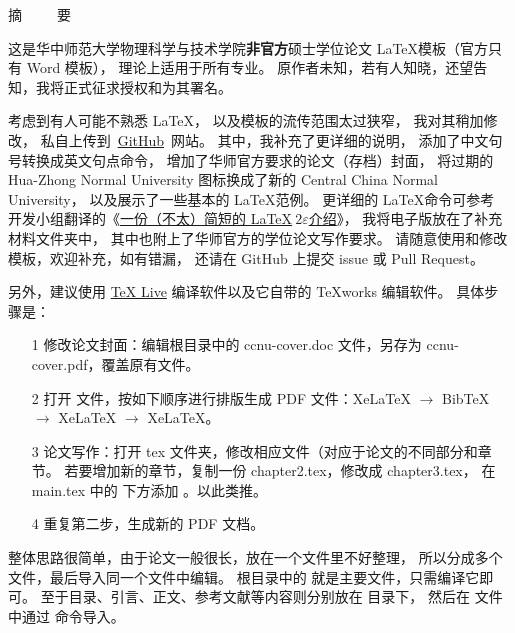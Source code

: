 \newpage
 \vspace{1.0cm}
 \headsep=1.5cm
 \centerline{\hei \sanhao 摘\ \ \ \ \ 要}
 \label{zhaiyao}
\vspace{0.5cm}
 \pagestyle{fancy}
 \fancyfoot[C]{---\thepage---}

这是华中师范大学物理科学与技术学院\textbf{非官方}硕士学位论文 \LaTeX 模板（官方只有 Word 模板），
理论上适用于所有专业。
原作者未知，若有人知晓，还望告知，我将正式征求授权和为其署名。

考虑到有人可能不熟悉 \LaTeX，
以及模板的流传范围太过狭窄，
我对其稍加修改，
私自上传到~\href{https://github.com/ichenh/ccnu-latex}{GitHub}~网站。
其中，我补充了更详细的说明，
添加了中文句号转换成英文句点命令，
增加了华师官方要求的论文（存档）封面，
将过期的 Hua-Zhong Normal University 图标换成了新的 Central China Normal University，
以及展示了一些基本的 \LaTeX 范例。
更详细的 \LaTeX 命令可参考 \CTeX 开发小组翻译的《\href{http://mirrors.ibiblio.org/CTAN/info/lshort/chinese/lshort-zh-cn.pdf}{一份（不太）简短的 \LaTeX $\ 2\varepsilon$介绍}》，
我将电子版放在了补充材料文件夹中，
其中也附上了华师官方的学位论文写作要求。
请随意使用和修改模板，欢迎补充，如有错漏，
还请在 GitHub 上提交 issue 或 Pull Request。

另外，建议使用 \href{https://ctan.org/mirrors/mirmon#cn}{TeX Live} 编译软件以及它自带的 TeXworks 编辑软件。
具体步骤是：

\begin{itemize}
\item[1] 修改论文封面：编辑根目录中的 ccnu-cover.doc 文件，另存为 ccnu-cover.pdf，覆盖原有文件。
\item[2] 打开 \verb!! 文件，按如下顺序进行排版生成 PDF 文件：XeLaTeX $\to$ BibTeX $\to$ XeLaTeX $\to$ XeLaTeX。
\item[3] 论文写作：打开 tex 文件夹，修改相应文件（对应于论文的不同部分和章节。
若要增加新的章节，复制一份 chapter2.tex，修改成 chapter3.tex，
在 main.tex 中的 \verb!! 下方添加 \verb!!。以此类推。
\item[4] 重复第二步，生成新的 PDF 文档。
\end{itemize}

整体思路很简单，由于论文一般很长，放在一个文件里不好整理，
所以分成多个文件，最后导入同一个文件中编辑。
根目录中的 \verb!! 就是主要文件，只需编译它即可。
至于目录、引言、正文、参考文献等内容则分别放在 \verb!! 目录下，
然后在 \verb!! 文件中通过 \verb!! 命令导入。

